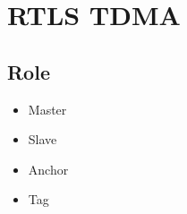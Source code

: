\documentclass[./main.tex]{subfiles}
\begin{document}
\chapter{RTLS TDMA}

\section{Role}

\begin{itemize}
    \item Master
    \item Slave
\end{itemize}

\begin{itemize}
    \item Anchor
    \item Tag
\end{itemize}
\end{document}
